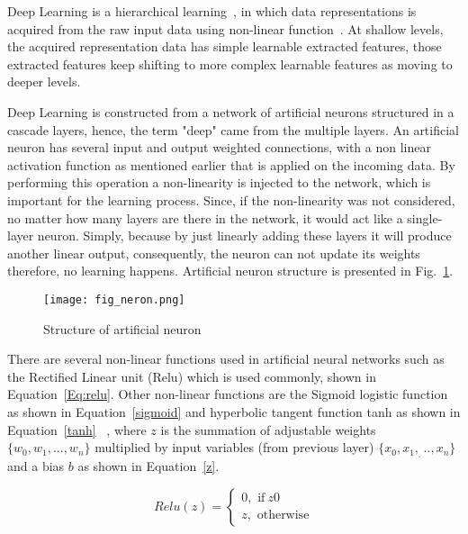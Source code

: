 Deep Learning is a hierarchical learning~\cite{Ongsulee2018}, in which
data representations is acquired from the raw input data using non-linear function~\cite{Lecun2015}. 
At shallow levels, the acquired representation data has simple learnable extracted features, those extracted features keep shifting to more complex learnable features as moving to deeper levels.

Deep Learning is constructed from a network of artificial neurons structured in a cascade layers, hence, the term "deep" came from the multiple layers.
An artificial neuron has several input and output weighted connections, with a non linear activation function as mentioned earlier that is applied on the  incoming data. 
By performing this operation a non-linearity is injected to the network, which is important for the learning process.
Since, if the non-linearity was not considered, no matter how many layers are there in the network, it would act like a single-layer neuron. 
Simply, because by just linearly adding these layers it will produce another linear output, consequently, the neuron can not update its weights therefore, no learning happens. Artificial neuron structure is presented in Fig.~\ref{fig:artificial Neuron}.

\begin{figure} [h!]
	\begin{center}
		\centering
	\texttt{[image: fig\_neron.png]}
	\end{center}
	
\caption{Structure of artificial neuron}
 
	\label{fig:artificial Neuron}
\end{figure}


There are several non-linear functions used in artificial neural networks such as the Rectified Linear unit (Relu) which is used commonly, shown in Equation~\ref{Eq:relu}. Other non-linear functions are the Sigmoid logistic function as shown in Equation~\ref{sigmoid} and hyperbolic tangent function tanh as shown in Equation~\ref{tanh} ~\cite{Lecun2015}, where \(z\) is the summation of adjustable weights \(\{w_0,w_1,...,w_n \}\) multiplied by input variables (from previous layer) \(\{x_0,x_1,_...,x_n\}\) and a bias \(b\) as shown in Equation~\ref{z}.






\begin{equation}
	Relu(z) = 
	\begin{cases}
		0,  \text{  if}\ z0\\
		z,  \text{  otherwise}
	\end{cases}
\label{Eq:relu}\end{equation}


